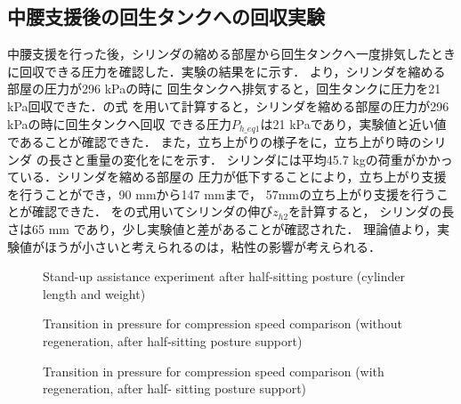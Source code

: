         \subsection{中腰支援後の回生タンクへの回収実験}
         中腰支援を行った後，シリンダの縮める部屋から回生タンクへ一度排気したとき
         に回収できる圧力を確認した．実験の結果をに示す．
         より，シリンダを縮める部屋の圧力が296 kPaの時に
         回生タンクへ排気すると，回生タンクに圧力を21 kPa回収できた．の式
         を用いて計算すると，シリンダを縮める部屋の圧力が296 kPaの時に回生タンクへ回収
         できる圧力$P_{h\_eq1}$は21 kPaであり，実験値と近い値であることが確認できた．
         また，立ち上がりの様子をに，立ち上がり時のシリンダ
         の長さと重量の変化をにを示す．
         シリンダには平均45.7 kgの荷重がかかっている．シリンダを縮める部屋の
         圧力が低下することにより，立ち上がり支援を行うことができ，90 mmから147 mmまで，
         57mmの立ち上がり支援を行うことが確認できた．
         をの式用いてシリンダの伸び$z_{h2}$を計算すると，
         シリンダの長さは65 mm であり，少し実験値と差があることが確認された．
         理論値より，実験値がほうが小さいと考えられるのは，粘性の影響が考えられる．
         \begin{figure}[t]%
                \begin{center}%
                 \caption{Stand-up assistance experiment after half-sitting posture (cylinder length and weight)}%
                \end{center}%
        \end{figure}%
        \begin{figure}[t]%
                \begin{center}%
                 \caption{Transition in pressure for compression speed comparison (without regeneration, after
                 half-sitting posture support)}%
                \end{center}%
        \end{figure}%
        \begin{figure}[t]%
                \begin{center}%
                 \caption{Transition in pressure for compression speed comparison (with regeneration, after half-
                 sitting posture support)}%
                \end{center}%
        \end{figure}%
